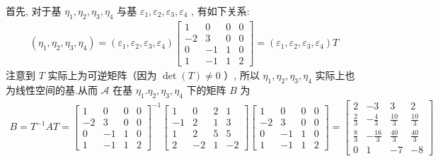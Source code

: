 \documentclass[11pt,a4paper,openany,oneside]{book}
\begin{document}
首先, 对于基 $ \eta_1, \eta_2, \eta_3, \eta_4 $ 与基 $ \varepsilon_1, \varepsilon_2, \varepsilon_3, \varepsilon_4 $ , 有如下关系:
\begin{gather*}
(\eta_1, \eta_2, \eta_3, \eta_4) = (\varepsilon_1, \varepsilon_2, \varepsilon_3, \varepsilon_4)
\begin{bmatrix}
1  &  0  &  0  &  0 \\
-2  &  3  &  0  &  0  \\
0  &  -1  &  1  &  0  \\
1  &  -1  &  1  &  2
\end{bmatrix}=(\varepsilon_1, \varepsilon_2, \varepsilon_3, \varepsilon_4)T
\end{gather*}
注意到 $ T $ 实际上为可逆矩阵（因为 $ \det(T) \neq 0 $ ）, 所以 $ \eta_1, \eta_2, \eta_3, \eta_4 $ 实际上也为线性空间的基.从而 $ \mathcal{A} $ 在基 $ \eta_1. \eta_2, \eta_3, \eta_4 $ 下的矩阵 $B$ 为
\begin{gather*}
B = T^{-1}AT =
\begin{bmatrix}
1  &  0  &  0  &  0 \\
-2  &  3  &  0  &  0  \\
0  &  -1  &  1  &  0  \\
1  &  -1  &  1  &  2
\end{bmatrix}^{-1}
\begin{bmatrix}
1  &  0  &  2  &  1  \\
-1  &  2  &  1  &  3  \\
1  &  2  &  5  &  5  \\
2  &  -2  &  1  &  -2
\end{bmatrix}
\begin{bmatrix}
1  &  0  &  0  &  0 \\
-2  &  3  &  0  &  0  \\
0  &  -1  &  1  &  0  \\
1  &  -1  &  1  &  2
\end{bmatrix} =
\begin{bmatrix}
2  &  -3  &  3  &  2  \\
\frac{2}{3}  &  -\frac{4}{3}  &  \frac{10}{3}  &  \frac{10}{3} \\
\frac{8}{3}  &  -\frac{16}{3} &  \frac{40}{3}  &  \frac{40}{3}  \\
0  &  1  &  -7  &  -8
\end{bmatrix}
\end{gather*}  \\  \\  \\
\end{document}

